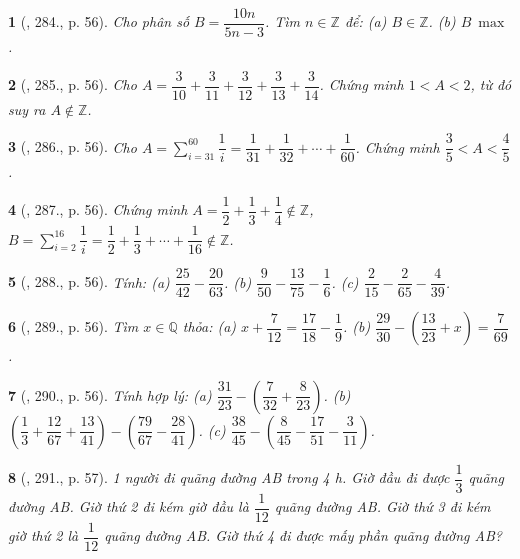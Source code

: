\documentclass{article}
\newtheorem{baitoan}{}
\begin{document}
\begin{baitoan}[\cite{Tuyen_Toan_6}, 284., p. 56]
	Cho phân số $B = \dfrac{10n}{5n - 3}$. Tìm $n\in\mathbb{Z}$ để: (a) $B\in\mathbb{Z}$. (b) $B\ \max$.
\end{baitoan}

\begin{baitoan}[\cite{Tuyen_Toan_6}, 285., p. 56]
	Cho $A = \dfrac{3}{10} + \dfrac{3}{11} + \dfrac{3}{12} + \dfrac{3}{13} + \dfrac{3}{14}$. Chứng minh $1 < A < 2$, từ đó suy ra $A\notin\mathbb{Z}$.
\end{baitoan}

\begin{baitoan}[\cite{Tuyen_Toan_6}, 286., p. 56]
	Cho $A = \sum_{i=31}^{60} \dfrac{1}{i} = \dfrac{1}{31} + \dfrac{1}{32} + \cdots + \dfrac{1}{60}$. Chứng minh $\dfrac{3}{5} < A < \dfrac{4}{5}$.
\end{baitoan}

\begin{baitoan}[\cite{Tuyen_Toan_6}, 287., p. 56]
	Chứng minh $A = \dfrac{1}{2} + \dfrac{1}{3} + \dfrac{1}{4}\notin\mathbb{Z}$, $B = \sum_{i=2}^{16} \dfrac{1}{i} = \dfrac{1}{2} + \dfrac{1}{3} + \cdots + \dfrac{1}{16}\notin\mathbb{Z}$.
\end{baitoan}

\begin{baitoan}[\cite{Tuyen_Toan_6}, 288., p. 56]
	Tính: (a) $\dfrac{25}{42} - \dfrac{20}{63}$. (b) $\dfrac{9}{50} - \dfrac{13}{75} - \dfrac{1}{6}$. (c) $\dfrac{2}{15} - \dfrac{2}{65} - \dfrac{4}{39}$.
\end{baitoan}

\begin{baitoan}[\cite{Tuyen_Toan_6}, 289., p. 56]
	Tìm $x\in\mathbb{Q}$ thỏa: (a) $x + \dfrac{7}{12} = \dfrac{17}{18} - \dfrac{1}{9}$. (b) $\dfrac{29}{30} - \left(\dfrac{13}{23} + x\right) = \dfrac{7}{69}$.
\end{baitoan}

\begin{baitoan}[\cite{Tuyen_Toan_6}, 290., p. 56]
	Tính hợp lý: (a) $\dfrac{31}{23} - \left(\dfrac{7}{32} + \dfrac{8}{23}\right)$. (b) $\left(\dfrac{1}{3} + \dfrac{12}{67} + \dfrac{13}{41}\right) - \left(\dfrac{79}{67} - \dfrac{28}{41}\right)$. (c) $\dfrac{38}{45} - \left(\dfrac{8}{45} - \dfrac{17}{51} - \dfrac{3}{11}\right)$.
\end{baitoan}

\begin{baitoan}[\cite{Tuyen_Toan_6}, 291., p. 57]
	1 người đi quãng đường AB trong {\rm4 h}. Giờ đầu đi được $\dfrac{1}{3}$ quãng đường AB. Giờ thứ 2 đi kém giờ đầu là $\dfrac{1}{12}$ quãng đường AB. Giờ thứ 3 đi kém giờ thứ 2 là $\dfrac{1}{12}$ quãng đường AB. Giờ thứ 4 đi được mấy phần quãng đường AB?
\end{baitoan}
\end{document}
